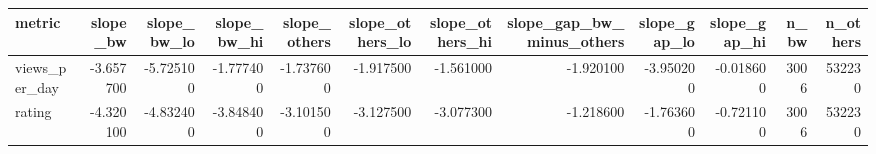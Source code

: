 \begin{tabular}{lrrrrrrrrrrr}
\toprule
metric & slope_bw & slope_bw_lo & slope_bw_hi & slope_others & slope_others_lo & slope_others_hi & slope_gap_bw_minus_others & slope_gap_lo & slope_gap_hi & n_bw & n_others \\
\midrule
views_per_day & -3.657700 & -5.725100 & -1.777400 & -1.737600 & -1.917500 & -1.561000 & -1.920100 & -3.950200 & -0.018600 & 3006 & 532230 \\
rating & -4.320100 & -4.832400 & -3.848400 & -3.101500 & -3.127500 & -3.077300 & -1.218600 & -1.763600 & -0.721100 & 3006 & 532230 \\
\bottomrule
\end{tabular}
